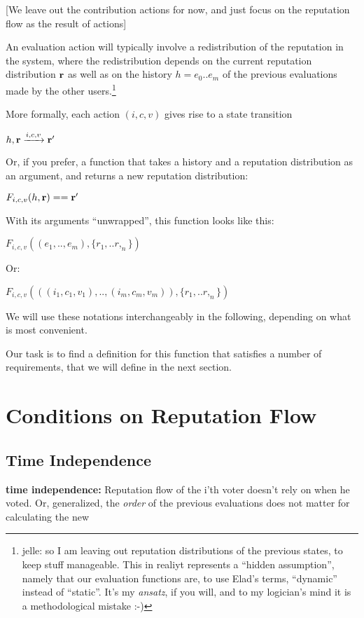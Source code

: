 \documentclass{article}
\begin{document}
[We leave out the contribution actions for now, and just focus on the reputation flow as the result of actions]


An evaluation action will typically involve a redistribution of the reputation in the system, where the redistribution depends on the current reputation distribution ${\bf r}$ as well as on the history $h = e_0 .. e_m$  of the previous evaluations made by the other users.\footnote{jelle: so I am leaving out reputation distributions of the previous states, to keep stuff manageable. This in realiyt represents a ``hidden assumption'', namely that our evaluation functions are, to use Elad's terms, ``dynamic'' instead of ``static''. It's my {\em ansatz}, if you will, and to my logician's mind it is a methodological mistake :-)}

More formally, each action $(i, c, v)$ gives rise to a state transition

\begin{center}
{ $h, {\bf r} \xrightarrow{i,c,v} {\bf r'}$ }
\end{center}
Or, if you prefer,  a function that takes a history and a reputation distribution as an argument, and returns a new reputation distribution:
\begin{center}
$F_{i,c,v}(h, {\bf r}) == {\bf r'}$
\end{center}
With its arguments ``unwrapped'', this function looks like this:
\begin{center}
$F_{i,c,v}((e_1, .. , e_m), \{r_1, .. r,_n\})$
\end{center}
Or:
\begin{center}
$F_{i,c,v}(((i_1,c_1,v_1), .. , (i_m, c_m, v_m)), \{r_1, .. r,_n\})$
\end{center}
We will use these notations interchangeably in the following, depending on what is most convenient.

Our task is to find a definition for this function that satisfies a number of requirements, that we will define in the next section.


\section{Conditions on Reputation Flow}

\subsection{Time Independence}

{\bf time independence:} Reputation flow of the i’th voter doesn’t rely on when he voted. Or, generalized, the {\em order} of the previous evaluations does not matter for calculating the new 
\end{document}
